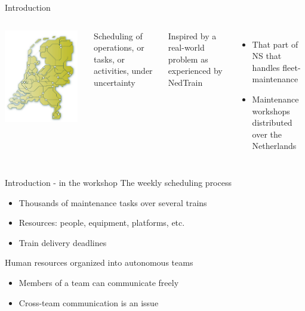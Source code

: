 \begin{frame}{Introduction}
\begin{columns}
		\includegraphics[width=0.95\textwidth]{spoornet-kaart}


		Scheduling of operations, or tasks, or activities, under uncertainty

		\medskip

		Inspired by a real-world problem as experienced by NedTrain
		\begin{itemize}
			\item That part of NS that handles fleet-maintenance 
			\item Maintenance workshops distributed over the Netherlands
		\end{itemize}
	\end{columns}
\end{frame}

\begin{frame}{Introduction - in the workshop}
	The weekly scheduling process
	\begin{itemize}
		\item Thousands of maintenance tasks over several trains
		\item Resources: people, equipment, platforms, etc.
		\item Train delivery deadlines
	\end{itemize}

	\bigskip

	Human resources organized into autonomous teams 
	\begin{itemize}
		\item Members of a team can communicate freely
		\item Cross-team communication is an issue
	\end{itemize}
\end{frame}

